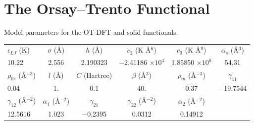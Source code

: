 \documentclass[12pt,a4paper]{book}
\begin{document}
		\section{The Orsay--Trento Functional}
			\begin{table}[t]
				Model parameters for the OT-DFT and solid functionals.
				\vspace{50pt}
				{\begin{tabular}{@{}lccccc}
					\hline
					\hline
					$\epsilon_{LJ}$  (K)    & $\sigma$ (\AA)& $h$ (\AA) & $c_2$ (K \AA$^6$)  & $c_3$ (K \AA$^9$) & $\alpha_s$ (\AA$^3$) \\
					 10.22   & 2.556 & 2.190323 & $-$2.41186 $\times 10^4$ & 1.85850 $\times 10^6$ & 54.31 \\
					\hline
					 $\rho_{0s}$ (\AA$^{-3}$)& $l$ (\AA)&$C$ (Hartree) &$\beta$ (\AA$^3$) & $\rho_m$ (\AA$^{-3}$) & $\gamma_{11}$ \\  
					  0.04& 1. & 0.1 &40.   & 0.37 & $-$19.7544 \\
					  \hline
					  $\gamma_{12}$ (\AA$^{-2}$)& $\alpha_1$  (\AA$^{-2}$) & $\gamma_{21}$  & $\gamma_{22}$ (\AA$^{-2}$) & $\alpha_2$ (\AA$^{-2}$) &      \\  
					   12.5616 &1.023 &  $-$0.2395 & 0.0312 & 0.14912  & \\
					\hline
					\hline
				\end{tabular}}
				\label{table1}
			\end{table}
			
\end{document}
